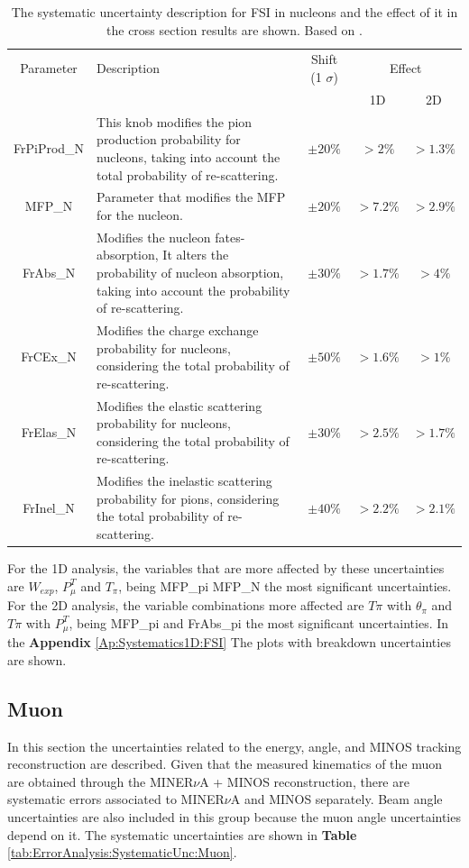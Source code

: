 \begin{table}[!htb]
    \centering
    \begin{tabular}{c|p{2in}|c|c|c}
        \hline 
        Parameter & Description  & Shift (1 $\sigma$) & \multicolumn{2}{c}{Effect} \\
         & & & 1D & 2D \\
        \hline  
        FrPiProd\_N & This knob modifies the pion production probability for nucleons, taking into account the total probability of re-scattering. & $\pm20\%$ & $>2\%$ & $>1.3\%$\\ \hline
        MFP\_N & Parameter that modifies the MFP for the nucleon. & $\pm20\%$ & $>7.2\%$ & $>2.9\%$ \\ \hline
        FrAbs\_N & Modifies the nucleon fates-absorption, It alters the probability of nucleon absorption, taking into account the probability of re-scattering. & $\pm30\%$ & $>1.7\%$ & $>4\%$ \\ \hline
        FrCEx\_N & Modifies the charge exchange probability for nucleons, considering the total probability of re-scattering. & $\pm50\%$ & $>1.6\%$ & $>1\%$\\ \hline
        FrElas\_N & Modifies the elastic scattering probability for nucleons, considering the total probability of re-scattering. & $\pm30\%$ & $>2.5\%$ & $>1.7\%$ \\ \hline
        FrInel\_N & Modifies the inelastic scattering probability for pions, considering the total probability of re-scattering. & $\pm40\%$ & $>2.2\%$ & $>2.1\%$\\ \hline
        
    \end{tabular}
    \caption{The systematic uncertainty description for FSI in nucleons and the effect of it in the cross section results are shown. Based on \cite{GENIEUnc}.}
    \label{tab:ErrorAnalysis:SystematicUnc:FSIN}
\end{table}

For the 1D analysis, the variables that are more affected by these uncertainties are $W_{exp}$, $P^T_\mu$ and $T_\pi$, being MFP\_pi MFP\_N the most significant uncertainties. For the 2D analysis, the variable combinations more affected are $T\pi$ with $\theta_\pi$ and $T\pi$ with $P^T_\mu$, being MFP\_pi and FrAbs\_pi the most significant uncertainties. In the \textbf{Appendix} \ref{Ap:Systematics1D:FSI} The plots with breakdown uncertainties are shown.


\subsection{Muon}
\label{Cap:ErrorAnalysis:SystematicUnc:Muon}
In this section the uncertainties related to the energy, angle, and MINOS tracking reconstruction are described. Given that the measured kinematics of the muon are obtained through the MINER$\nu$A + MINOS reconstruction, there are systematic errors associated to MINER$\nu$A and MINOS separately. Beam angle uncertainties are also included in this group because the muon angle uncertainties depend on it. The systematic uncertainties are shown in \textbf{Table} \ref{tab:ErrorAnalysis:SystematicUnc:Muon}.  

